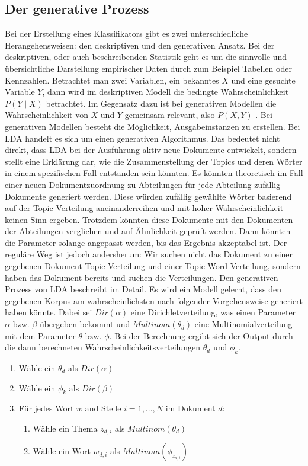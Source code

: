 \documentclass[german,version-2020-11]{uzl-thesis}
\begin{document}
\subsection{Der generative Prozess} 
Bei der Erstellung eines Klassifikators gibt es zwei unterschiedliche Herangehensweisen: den deskriptiven und den generativen Ansatz. Bei der deskriptiven, oder auch beschreibenden Statistik geht es um die sinnvolle und übersichtliche Darstellung empirischer Daten durch zum Beispiel Tabellen oder Kennzahlen. Betrachtet man zwei Variablen, ein bekanntes $X$ und eine gesuchte Variable $Y$, dann wird im deskriptiven Modell die bedingte Wahrscheinlichkeit $P(Y \mid X)$ betrachtet. Im Gegensatz dazu ist bei generativen Modellen die Wahrscheinlichkeit von $X$ und $Y$ gemeinsam relevant, also $P(X, Y)$ . Bei generativen Modellen besteht die Möglichkeit, Ausgabeinstanzen zu erstellen. Bei LDA handelt es sich um einen generativen Algorithmus. Das bedeutet nicht direkt, dass LDA bei der Ausführung aktiv neue Dokumente entwickelt, sondern stellt eine Erklärung dar, wie die Zusammenstellung der Topics und deren Wörter in einem spezifischen Fall entstanden sein könnten. Es könnten theoretisch im Fall einer neuen Dokumentzuordnung zu Abteilungen für jede Abteilung zufällig Dokumente generiert werden. Diese würden zufällig gewählte Wörter basierend auf der Topic-Verteilung aneinanderreihen und mit hoher Wahrscheinlichkeit keinen Sinn ergeben. Trotzdem könnten diese Dokumente mit den Dokumenten der Abteilungen verglichen und auf Ähnlichkeit geprüft werden. Dann könnten die Parameter solange angepasst werden, bis das Ergebnis akzeptabel ist. Der reguläre Weg ist jedoch andersherum: Wir suchen nicht das Dokument zu einer gegebenen Dokument-Topic-Verteilung und einer Topic-Word-Verteilung, sondern haben das Dokument bereits und suchen die Verteilungen. Den generativen Prozess von LDA beschreibt \cite{t5} im Detail. Es wird ein Modell gelernt, dass den gegebenen Korpus am wahrscheinlichsten nach folgender Vorgehensweise generiert haben könnte. Dabei sei $Dir(\alpha)$ eine Dirichletverteilung, was einen Parameter $\alpha$ bzw. $\beta$ übergeben bekommt und $Multinom(\theta_d)$ eine Multinomialverteilung mit dem Parameter $\theta$ bzw. $\phi$. Bei der Berechnung ergibt sich der Output durch die dann berechneten Wahrscheinlichkeitsverteilungen $\theta_d$ und $\phi_k$.

\begin{enumerate}
	\item Wähle ein $\theta_d$ als $Dir(\alpha)$
	\item Wähle ein $\phi_k$ als $Dir(\beta)$
	\item Für jedes Wort $w$ and Stelle $i = 1,...,N$ im Dokument $d$: 
	\begin{enumerate}
		\item Wähle ein Thema $z_{d,i}$ als $Multinom(\theta_d)$
		\item Wähle ein Wort $w_{d,i}$ als $Multinom(\phi_{z_{d,i}})$
	\end{enumerate}
\end{enumerate}
\end{document}
